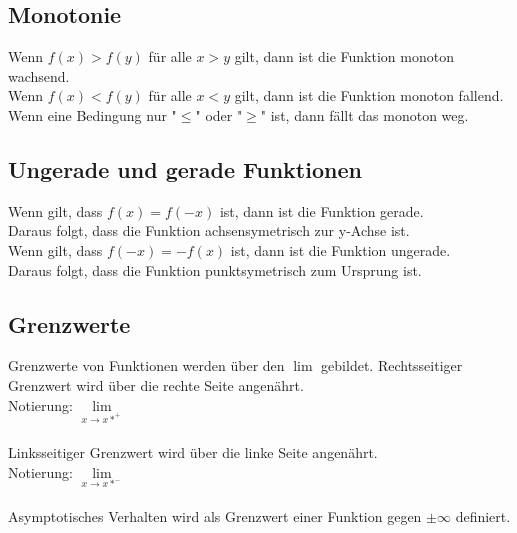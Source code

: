 \documentclass[a4paper,landscape, 11pt]{article}
\newcommand{\limFromTo}[2]{ \lim\limits_{#2 \rightarrow #1}}
\begin{document}
\begin{multicols}{4}
\begin{small}
             \subsection{Monotonie}
                 Wenn $f(x) > f(y)$ für alle $x > y$ gilt, dann ist die Funktion monoton wachsend. \\
                 Wenn $f(x) < f(y)$ für alle $x < y$ gilt, dann ist die Funktion monoton fallend. \\
                 Wenn eine Bedingung nur "$\le$" oder "$\ge$" ist, dann fällt das monoton weg.
                 
             \subsection{Ungerade und gerade Funktionen}
                 Wenn gilt, dass $f(x) = f(-x)$ ist, dann ist die Funktion gerade. \\
                 Daraus folgt, dass die Funktion achsensymetrisch zur y-Achse ist.\\
                 Wenn gilt, dass $f(-x) = -f(x)$ ist, dann ist die Funktion ungerade.\\
                 Daraus folgt, dass die Funktion punktsymetrisch zum Ursprung ist.
              
              \subsection{Grenzwerte}
                  Grenzwerte von Funktionen werden über den $\lim$ gebildet.
                  Rechtsseitiger Grenzwert wird über die rechte Seite angenährt. \\
                  Notierung: $\limFromTo{x*^+}{x}$ \\ 
                  \\
                  Linksseitiger Grenzwert wird über die linke Seite angenährt. \\
                  Notierung: $\limFromTo{x*^-}{x}$ \\ 
                  \\
                  Asymptotisches Verhalten wird als Grenzwert einer Funktion gegen $\pm \infty$ definiert.

\end{small}
\end{multicols}
\end{document}
